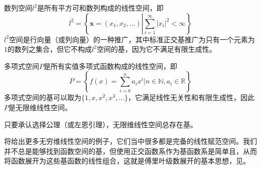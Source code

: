 \begin{example}
    数列空间$l^2$是所有平方可和数列构成的线性空间，即
    \[l^2=\left\{\mathbf{x}=(x_1,x_2,\ldots)\left|\sum_{i=1}^{\infty}|x_i|^2<\infty\right.\right\}\]
    $l^2$空间是行向量（或列向量）的一种推广，其中标准正交基推广为只有一个元素为$1$的数列之集合，但它不构成$l^2$空间的基，因为它不满足有限生成性。
\end{example}
\begin{example}
    多项式空间$P$是所有实值多项式函数构成的线性空间，即
    \[P=\left\{f(x)=\sum_{i=0}^{n}a_i x^i|n\in \mathbb{N},a_i\in \mathbb{R}\right\}\]
    多项式空间的基可以取为$\{1,x,x^2,x^3,\ldots\}$，它满足线性无关性和有限生成性，因此$P$是无限维线性空间。
\end{example}

\begin{claim}
    只要承认选择公理（或左恩引理），无限维线性空间总存在基。
\end{claim}

将给出更多无穷维线性空间的例子，它们当中很多都是完备的线性赋范空间。我们并不总是能够找到函数空间的基，但使用正交函数系作为基函数系是简单且，从而将函数展开为这些基函数的线性组合，这就是傅里叶级数展开的基本思想，见。